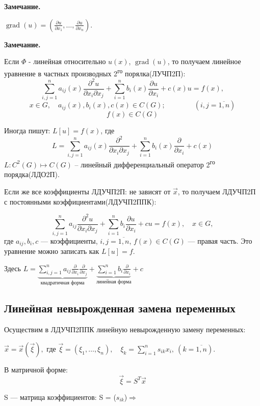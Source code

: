 \documentclass{article}
\newenvironment{note}{\par\medskip\noindent
  \textbf{Замечание. }\par\nobreak\noindent\ignorespaces
}{\par\medskip
}
\begin{document}
\begin{note}
$\operatorname{grad}(u) = (\frac{\partial u}{\partial x_1}, \ldots, \frac{\partial u}{\partial x_n})$.
\end{note}
\begin{note}
Если $\Phi$ - линейная относительно $u(x)$, $\operatorname{grad}(u)$, то получаем линейное уравнение в частных производных 2\textsuperscript{го} порялка(ЛУЧП2П):
$$\sum_{i,j=1}^{n} a_{ij}(x)\frac{\partial^2u}{\partial x_i \partial x_j} + \sum_{i=1}^{n} b_{i}(x)\frac{\partial u}{\partial x_i} + c(x)u = f(x),$$
\[
  x \in G,\quad a_{ij}(x), b_i(x), c(x) \in C(G); \qquad\qquad (i,j = \overline{1,n})
\]
$$f(x) \in C(G)$$
\end{note}

Иногда пишут:
$L[u]=f(x)$, где
$$\displaystyle L= \sum_{i,j=1}^{n} a_{ij}(x)\frac{\partial^2}{\partial x_i \partial x_j} + \sum_{i=1}^{n} b_{i}(x)\frac{\partial }{\partial x_i} + c(x)$$
$\displaystyle L: C^2(G)\mapsto C(G)$ -- линейный дифференциальный оператор 2\textsuperscript{го} порядка(ЛДО2П).\par\medskip


Если же все коэффициенты ЛДУЧП2П: не зависят от $\vec x$, то получаем ЛДУЧП2П с постоянными коэффициентами(ЛДУЧП2ППК):

\[
\sum_{i,j=1}^{n} a_{ij}\frac{\partial^2u}{\partial x_i \partial x_j} + \sum_{i=1}^{n} b_{i}\frac{\partial u}{\partial x_i} + cu = f(x), \quad x \in G,
\]
где \(a_{ij}, b_i, c\) --- коэффициенты, \(i,j = \overline{1,n}\), \(f(x) \in C(G)\) --- правая часть. Это уравнение можно записать как \(L[u]=f\).

Здесь
$\displaystyle L= 
  \underbrace{\sum_{i,j=1}^{n} a_{ij}\frac{\partial}{\partial x_i} \frac{\partial}{\partial x_j}}_{\text{квадратичная форма}}
  +\underbrace{\sum_{i=1}^{n} b_{i}\frac{\partial }{\partial x_i}}_{\text{линейная форма}} + c$

\subsection{Линейная невырожденная замена переменных}
Осуществим в ЛДУЧП2ППК линейную невырожденную замену переменных:

$\displaystyle\vec x=\vec x(\vec \xi),$ где $\displaystyle\vec \xi=(\xi_1, \ldots, \xi_n),\quad \xi_k = \sum_{i=1}^{n}s_{ik}x_i,\ (k=\overline{1,n})$.

В матричной форме: $$\vec \xi = S^T \vec x$$

S --- матрица коэффициентов: S = ($s_{ik}$)$\Rightarrow$
\end{document}
